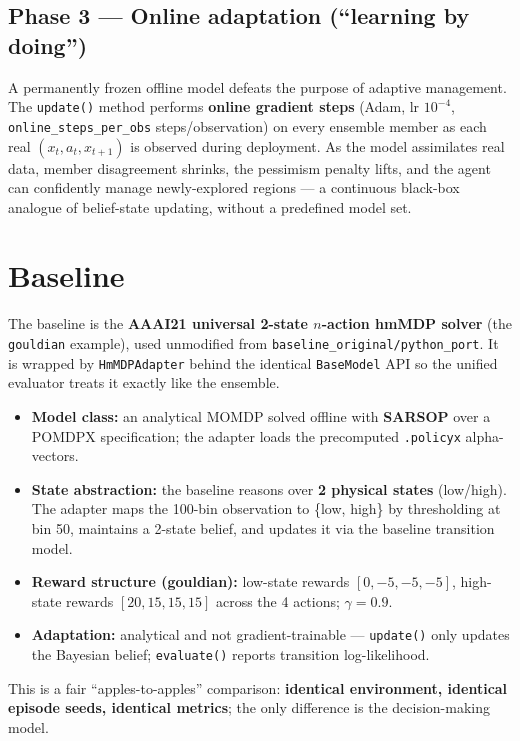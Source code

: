 \documentclass[11pt]{article}
\begin{document}
\subsection{Phase 3 --- Online adaptation (``learning by doing'')}
A permanently frozen offline model defeats the purpose of adaptive
management. The \texttt{update()} method performs \textbf{online gradient
steps} (Adam, lr $10^{-4}$, \texttt{online\_steps\_per\_obs}
steps/observation) on every ensemble member as each real
$(x_t,a_t,x_{t+1})$ is observed during deployment. As the model assimilates
real data, member disagreement shrinks, the pessimism penalty lifts, and the
agent can confidently manage newly-explored regions --- a continuous
black-box analogue of belief-state updating, without a predefined model set.

\section{Baseline}

The baseline is the \textbf{AAAI21 universal 2-state $n$-action hmMDP solver}
(the \texttt{gouldian} example), used unmodified from
\texttt{baseline\_original/python\_port}. It is wrapped by
\texttt{HmMDPAdapter} behind the identical \texttt{BaseModel} API so the
unified evaluator treats it exactly like the ensemble.
\begin{itemize}
  \item \textbf{Model class:} an analytical MOMDP solved offline with
        \textbf{SARSOP} over a POMDPX specification; the adapter loads the
        precomputed \texttt{.policyx} alpha-vectors.
  \item \textbf{State abstraction:} the baseline reasons over \textbf{2
        physical states} (low/high). The adapter maps the 100-bin
        observation to \{low, high\} by thresholding at bin 50, maintains a
        2-state belief, and updates it via the baseline transition model.
  \item \textbf{Reward structure (gouldian):} low-state rewards
        $[0,-5,-5,-5]$, high-state rewards $[20,15,15,15]$ across the 4
        actions; $\gamma = 0.9$.
  \item \textbf{Adaptation:} analytical and not gradient-trainable ---
        \texttt{update()} only updates the Bayesian belief;
        \texttt{evaluate()} reports transition log-likelihood.
\end{itemize}
This is a fair ``apples-to-apples'' comparison: \textbf{identical
environment, identical episode seeds, identical metrics}; the only
difference is the decision-making model.
\end{document}
